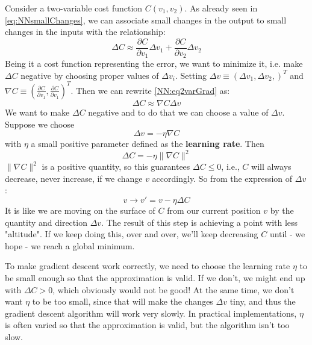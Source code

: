 \documentclass[12pt, letterpaper]{article}
\theoremstyle{definition}
\let\tb\textbf
\begin{document}
Consider a two-variable cost function $C(v_1, v_2)$. As already seen in \autoref{eq:NNsmallChanges}, we can associate small changes in the output to small changes in the inputs with the relationship:
\begin{equation}
\Delta C \approx \frac{\partial C}{\partial v_1} \Delta v_1 +\frac{\partial C}{\partial v_2} \Delta v_2
\label{NN:eq2varGrad}
\end{equation}
Being it a cost function representing the error, we want to minimize it, i.e. make $\Delta C$ negative by choosing proper values of $\Delta v_i$. Setting $\Delta v \equiv \left( \Delta v_1, \Delta v_2, \right)^T$ and $\nabla C \equiv \left( \frac{\partial C}{\partial v_1}, \frac{\partial C}{\partial v_1}\right)^T$. Then we can rewrite \autoref{NN:eq2varGrad} as:
\begin{equation}
\Delta C \approx \nabla C \Delta v
\end{equation}
We want to make $\Delta C$ negative and to do that we can choose a value of $\Delta v$. Suppose we choose
\begin{equation}
\Delta v = -\eta \nabla C
\end{equation}
with $\eta$ a small positive parameter defined as the \tb{learning rate}. Then
\begin{equation}
\Delta C = -\eta \| \nabla C \|^2
\end{equation}
$ \| \nabla C \|^2$ is a positive quantity, so this guarantees $\Delta C \le 0$, i.e., $C$ will always decrease, never increase, if we change $v$ accordingly. So from the expression of $\Delta v$:
\begin{equation}
v \rightarrow v' = v -\eta \Delta C
\end{equation}
It is like we are moving on the surface of $C$ from our current position $v$ by the quantity and direction $\Delta v$. The result of this step is achieving a point with less "altitude". If we keep doing this, over and over, we'll keep decreasing $C$ until - we hope - we reach a global minimum.

To make gradient descent work correctly, we need to choose the learning rate $\eta$ to be small enough so that the approximation is valid. If we don't, we might end up with $\Delta C > 0$, which obviously would not be good! At the same time, we don't want $\eta$ to be too small, since that will make the changes $\Delta v$ tiny, and thus the gradient descent algorithm will work very slowly. In practical implementations, $\eta$ is often varied so that the approximation is valid, but the algorithm isn't too slow. 
\end{document}
